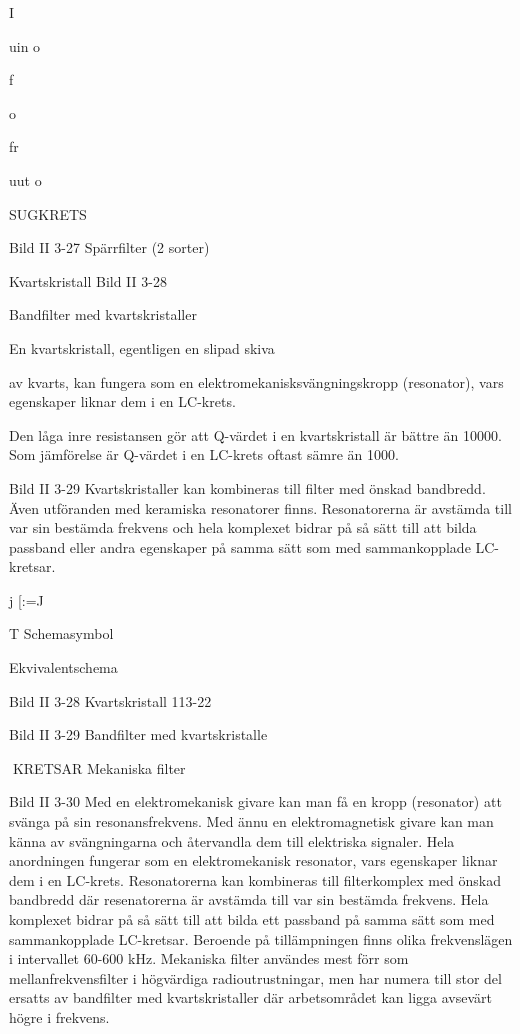 \documentclass[a4paper,twoside,twocolumn,openright]{book}
\begin{document}
{{{{{{{I

uin
o

f

o

fr

uut
o

SUGKRETS

Bild II 3-27 Spärrfilter (2 sorter)

Kvartskristall
Bild II 3-28

Bandfilter med kvartskristaller

En kvartskristall, egentligen en slipad skiva

av kvarts, kan fungera som en elektromekanisksvängningskropp (resonator), vars egenskaper liknar dem i en LC-krets.

Den låga inre resistansen gör att Q-värdet i en kvartskristall är bättre än 10000.
Som jämförelse är Q-värdet i en LC-krets
oftast sämre än 1000.

Bild II 3-29
Kvartskristaller kan kombineras till filter med
önskad bandbredd. Även utföranden med
keramiska resonatorer finns.
Resonatorerna är avstämda till var sin
bestämda frekvens och hela komplexet bidrar på så sätt till att bilda passband eller
andra egenskaper på samma sätt som med
sammankopplade LC-kretsar.

j
[:=J

T
Schemasymbol

Ekvivalentschema

Bild II 3-28 Kvartskristall
113-22

Bild II 3-29 Bandfilter med kvartskristalle

KRETSAR
Mekaniska filter

Bild II 3-30
Med en elektromekanisk givare kan man få
en kropp (resonator) att svänga på sin resonansfrekvens. Med ännu en elektromagnetisk givare kan man känna av svängningarna och återvandla dem till elektriska signaler. Hela anordningen fungerar som en elektromekanisk resonator, vars egenskaper liknar dem i en LC-krets.
Resonatorerna kan kombineras till filterkomplex med önskad bandbredd där resenatorerna är avstämda till var sin bestämda frekvens. Hela komplexet bidrar på så
sätt till att bilda ett passband på samma sätt
som med sammankopplade LC-kretsar.
Beroende på tillämpningen finns olika frekvenslägen i intervallet 60-600 kHz.
Mekaniska filter användes mest förr som
mellanfrekvensfilter i högvärdiga radioutrustningar, men har numera till stor del ersatts
av bandfilter med kvartskristaller där arbetsområdet kan ligga avsevärt högre i frekvens.

}}}}}}}
\end{document}
